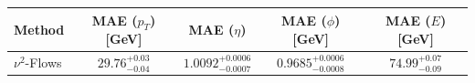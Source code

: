     \begin{tabular}{lcccc}
        \toprule
        Method & MAE ($p_T$) [GeV] & MAE ($\eta$) & MAE ($\phi$) [GeV] & MAE ($E$) [GeV] \\
        \midrule
        $\nu^2$-Flows & $29.76^{+0.03}_{-0.04}$ & $1.0092^{+0.0006}_{-0.0007}$ & $0.9685^{+0.0006}_{-0.0008}$ & $74.99^{+0.07}_{-0.09}$ \\
        \bottomrule
    \end{tabular}